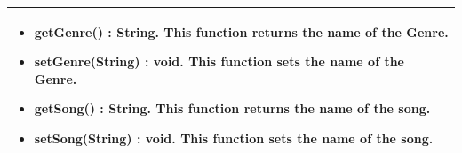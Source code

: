 \documentclass[letterpaper,english, 12pt]{scrreprt}
\begin{document}
\begin{center}
\begin{tabular}{|C{15cm}|}
\begin{itemize}
                                        \item getGenre() : String. This function returns the name of the Genre.
                                        \item setGenre(String) : void. This function sets the name of the Genre.
                                        \item getSong() : String. This function returns the name of the song.
					 \item setSong(String) : void. This function sets the name of the song.
                        \end{itemize} \\
                        \hline
        \end{tabular}
\end{center}
\end{document}

